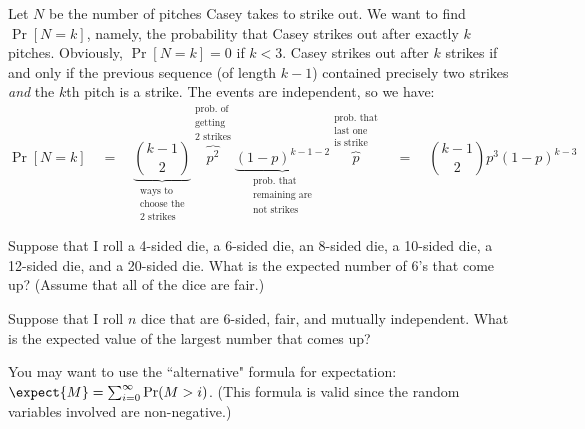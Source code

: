 \documentclass[11pt, twoside]{article}
\def\lab#1#2#3{\substack{\text{#1}\\ \text{#2}\\ \text{#3}}}
\begin{document}
\begin{problems}
{Let $N$ be the number of pitches Casey takes to strike out. We want to find $\Pr [N=k]$, namely, the probability that Casey strikes out after exactly $k$ pitches. Obviously, $\Pr [N=k]=0$ if $k< 3$. Casey strikes out after $k$ strikes if and only if the previous sequence (of length $k-1$) contained precisely two strikes \emph{and} the $k$th pitch is a strike. The events are independent, so we have:
\[
\Pr[N=k]\quad=\quad
\underbrace{\binom{k-1}{2}}_{\lab{ways to}{choose the}{2 strikes}}
\overbrace{p^2}^{\lab{prob. of}{getting}{2 strikes} }\underbrace{(1-p)^{k-1-2}}_{\lab{prob. that}{remaining are}{not strikes}} \overbrace{p}^{\lab{prob. that}{last one}{is strike}}\quad =\quad \binom{k-1}{2}p^3(1-p)^{k-3}
\]  
}

\problem  {} %
\problempart
Suppose that I roll a 4-sided die, a 6-sided
die, an 8-sided die, a 10-sided die, a 12-sided die, and a 20-sided
die.  What is the expected number of 6's that come up?  (Assume that
all of the dice are fair.)

\problempart
Suppose that I roll $n$ dice that are
6-sided, fair, and mutually independent.  What is the expected value
of the largest number that comes up?

\hint You may want to use the ``alternative" formula for expectation:
$\expect{M} = \sum_{i=0}^{\infty} \Pr(M > i)$. (This formula is valid
since the random variables involved are non-negative.)


\end{problems}
\end{document}
